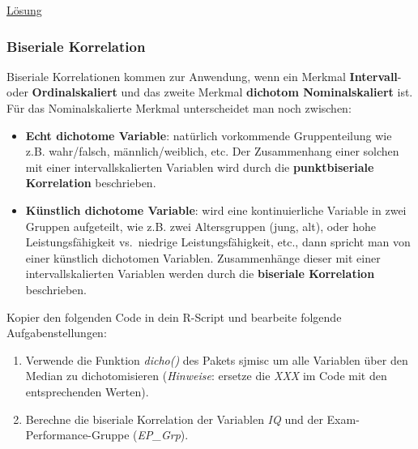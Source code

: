 \documentclass[
]{article}
\providecommand{\tightlist}{%
  \setlength{\itemsep}{0pt}\setlength{\parskip}{0pt}}
\begin{document}
\hyperref[aufgabe-spearman-lsg]{Lösung}

\subsubsection*{Biseriale Korrelation}\label{biseriale-korrelation}

Biseriale Korrelationen kommen zur Anwendung, wenn ein Merkmal \textbf{Intervall}- oder \textbf{Ordinalskaliert} und das zweite Merkmal \textbf{dichotom Nominalskaliert} ist. Für das Nominalskalierte Merkmal unterscheidet man noch zwischen:

\begin{itemize}
\tightlist
\item
  \textbf{Echt dichotome Variable}: natürlich vorkommende Gruppenteilung wie z.B. wahr/falsch, männlich/weiblich, etc. Der Zusammenhang einer solchen mit einer intervallskalierten Variablen wird durch die \textbf{punktbiseriale Korrelation} beschrieben.
\item
  \textbf{Künstlich dichotome Variable}: wird eine kontinuierliche Variable in zwei Gruppen aufgeteilt, wie z.B. zwei Altersgruppen (jung, alt), oder hohe Leistungsfähigkeit vs.~niedrige Leistungsfähigkeit, etc., dann spricht man von einer künstlich dichotomen Variablen. Zusammenhänge dieser mit einer intervallskalierten Variablen werden durch die \textbf{biseriale Korrelation} beschrieben.
\end{itemize}

Kopier den folgenden Code in dein R-Script und bearbeite folgende Aufgabenstellungen:

\begin{enumerate}
\def\labelenumi{\arabic{enumi}.}
\tightlist
\item
  Verwende die Funktion \emph{dicho()} des Pakets sjmisc um alle Variablen über den Median zu dichotomisieren (\emph{Hinweise}: ersetze die \emph{XXX} im Code mit den entsprechenden Werten).
\item
  Berechne die biseriale Korrelation der Variablen \emph{IQ} und der Exam-Performance-Gruppe (\emph{EP\_Grp}).
\end{enumerate}
\end{document}
